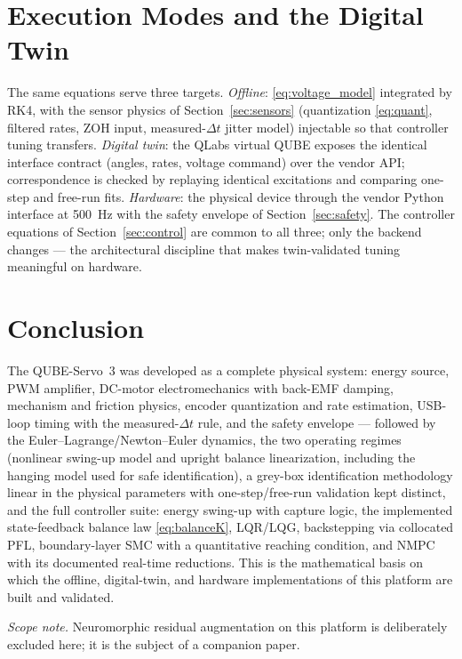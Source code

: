 \documentclass[conference]{IEEEtran}
\begin{document}
\section{Execution Modes and the Digital Twin}
The same equations serve three targets. \emph{Offline}: \eqref{eq:voltage_model} integrated by RK4, with the sensor physics of Section~\ref{sec:sensors} (quantization \eqref{eq:quant}, filtered rates, ZOH input, measured-$\Delta t$ jitter model) injectable so that controller tuning transfers. \emph{Digital twin}: the QLabs virtual QUBE exposes the identical interface contract (angles, rates, voltage command) over the vendor API; correspondence is checked by replaying identical excitations and comparing one-step and free-run fits. \emph{Hardware}: the physical device through the vendor Python interface at 500~Hz with the safety envelope of Section~\ref{sec:safety}. The controller equations of Section~\ref{sec:control} are common to all three; only the backend changes --- the architectural discipline that makes twin-validated tuning meaningful on hardware.

\section{Conclusion}
The QUBE-Servo~3 was developed as a complete physical system: energy source, PWM amplifier, DC-motor electromechanics with back-EMF damping, mechanism and friction physics, encoder quantization and rate estimation, USB-loop timing with the measured-$\Delta t$ rule, and the safety envelope --- followed by the Euler--Lagrange/Newton--Euler dynamics, the two operating regimes (nonlinear swing-up model and upright balance linearization, including the hanging model used for safe identification), a grey-box identification methodology linear in the physical parameters with one-step/free-run validation kept distinct, and the full controller suite: energy swing-up with capture logic, the implemented state-feedback balance law \eqref{eq:balanceK}, LQR/LQG, backstepping via collocated PFL, boundary-layer SMC with a quantitative reaching condition, and NMPC with its documented real-time reductions. This is the mathematical basis on which the offline, digital-twin, and hardware implementations of this platform are built and validated.

\vspace{6pt}
\noindent\textit{Scope note.} Neuromorphic residual augmentation on this platform is deliberately excluded here; it is the subject of a companion paper.
\end{document}
